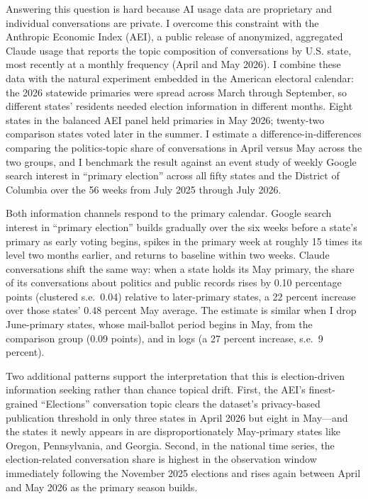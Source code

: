 \documentclass[12pt]{article}
\begin{document}
Answering this question is hard because AI usage data are proprietary and individual conversations are private. I overcome this constraint with the Anthropic Economic Index (AEI), a public release of anonymized, aggregated Claude usage that reports the topic composition of conversations by U.S. state, most recently at a monthly frequency (April and May 2026). I combine these data with the natural experiment embedded in the American electoral calendar: the 2026 statewide primaries were spread across March through September, so different states' residents needed election information in different months. Eight states in the balanced AEI panel held primaries in May 2026; twenty-two comparison states voted later in the summer. I estimate a difference-in-differences comparing the politics-topic share of conversations in April versus May across the two groups, and I benchmark the result against an event study of weekly Google search interest in ``primary election'' across all fifty states and the District of Columbia over the 56 weeks from July 2025 through July 2026.

Both information channels respond to the primary calendar. Google search interest in ``primary election'' builds gradually over the six weeks before a state's primary as early voting begins, spikes in the primary week at roughly 15 times its level two months earlier, and returns to baseline within two weeks. Claude conversations shift the same way: when a state holds its May primary, the share of its conversations about politics and public records rises by 0.10 percentage points (clustered s.e.\ 0.04) relative to later-primary states, a 22 percent increase over those states' 0.48 percent May average. The estimate is similar when I drop June-primary states, whose mail-ballot period begins in May, from the comparison group (0.09 points), and in logs (a 27 percent increase, s.e.\ 9 percent).

Two additional patterns support the interpretation that this is election-driven information seeking rather than chance topical drift. First, the AEI's finest-grained ``Elections'' conversation topic clears the dataset's privacy-based publication threshold in only three states in April 2026 but eight in May---and the states it newly appears in are disproportionately May-primary states like Oregon, Pennsylvania, and Georgia. Second, in the national time series, the election-related conversation share is highest in the observation window immediately following the November 2025 elections and rises again between April and May 2026 as the primary season builds.
\end{document}
